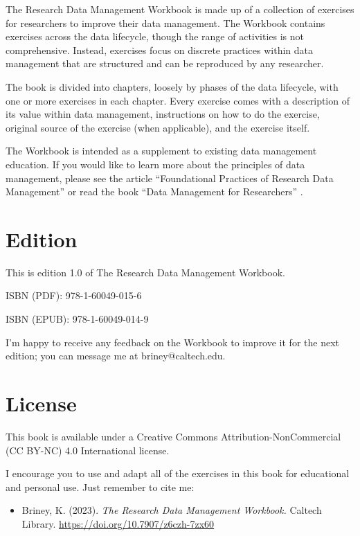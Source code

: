 \documentclass[
]{book}
\providecommand{\tightlist}{%
  \setlength{\itemsep}{0pt}\setlength{\parskip}{0pt}}
\begin{document}
The Research Data Management Workbook is made up of a collection of exercises for researchers to improve their data management. The Workbook contains exercises across the data lifecycle, though the range of activities is not comprehensive. Instead, exercises focus on discrete practices within data management that are structured and can be reproduced by any researcher.

The book is divided into chapters, loosely by phases of the data lifecycle, with one or more exercises in each chapter. Every exercise comes with a description of its value within data management, instructions on how to do the exercise, original source of the exercise (when applicable), and the exercise itself.

The Workbook is intended as a supplement to existing data management education. If you would like to learn more about the principles of data management, please see the article ``Foundational Practices of Research Data Management'' \citep{briney_foundational_2020} or read the book ``Data Management for Researchers'' \citep{briney_data_2015}.

\hypertarget{edition}{%
\section*{Edition}\label{edition}}

This is edition 1.0 of The Research Data Management Workbook.

ISBN (PDF): 978-1-60049-015-6

ISBN (EPUB): 978-1-60049-014-9

I'm happy to receive any feedback on the Workbook to improve it for the next edition; you can message me at briney@caltech.edu.

\hypertarget{license}{%
\section*{License}\label{license}}

This book is available under a Creative Commons Attribution-NonCommercial (CC BY-NC) 4.0 International license.

I encourage you to use and adapt all of the exercises in this book for educational and personal use. Just remember to cite me:

\begin{itemize}
\tightlist
\item
  Briney, K. (2023). \emph{The Research Data Management Workbook.} Caltech Library. \url{https://doi.org/10.7907/z6czh-7zx60}
\end{itemize}
\end{document}
